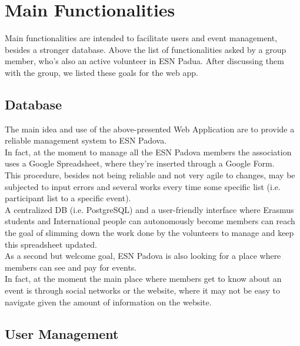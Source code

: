 \section{Main Functionalities}

Main functionalities are intended to facilitate users and event management, besides a stronger database.
Above the list of functionalities asked by a group member, who's also an active volunteer in ESN Padua.
After discussing them  with the group, we listed these goals for the web app.

\subsection{Database}
The main idea and use of the above-presented Web Application are to provide a reliable management system to ESN Padova. \\
In fact, at the moment to manage all the ESN Padova members the association uses a Google Spreadsheet, where they're inserted 
through a Google Form. \\
This procedure, besides not being reliable and not very agile to changes, may be subjected to input errors and several works 
every time some specific list (i.e. participant list to a specific event).\\
A centralized DB (i.e. PostgreSQL) and a user-friendly interface where Erasmus students and International people can autonomously 
become members can reach the goal of slimming down the work done by the volunteers to manage and keep this spreadsheet updated.\\
As a second but welcome goal, ESN Padova is also looking for a place where members can see and pay for events.\\
In fact, at the moment the main place where members get to know about an event is through social networks or the website, where it
may not be easy to navigate given the amount of information on the website.
\subsection{User Management}

